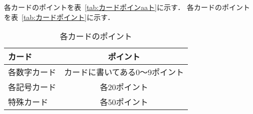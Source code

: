 \documentclass[11pt]{ltjsarticle}
\newcommand{\tabref}[1]{表~\ref{#1}}
\begin{document}
各カードのポイントを\tabref{tab:カードポインaaト}に示す．
各カードのポイントを\tabref{tab:カードポイント}に示す．

\begin{table}[h]
  \begin{center}
    \caption{各カードのポイント}
    \begin{tabular}{|l|c|} \hline
      カード & ポイント \\ \hline \hline
      各数字カード & カードに書いてある0～9ポイント \\
      各記号カード & 各20ポイント \\
      特殊カード & 各50ポイント \\ \hline
    \end{tabular}
    \label{tab:カードポイtント}
  \end{center}
\end{table}

\label{tab:カードポイaaatント}
\end{document}
